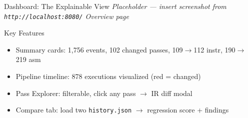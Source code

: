 \documentclass[aspectratio=169]{beamer}
\begin{document}
\begin{frame}{Dashboard: The Explainable View}
  \centering
  \vspace{1em}
  \vspace{0.5em}
  \small \textit{Placeholder — insert screenshot from \texttt{http://localhost:8080/} Overview page}
  \vspace{1em}
  \begin{alertblock}{Key Features}
    \begin{itemize}
      \item Summary cards: 1,756 events, 102 changed passes, 109$\to$112 instr, 190$\to$219 asm
      \item Pipeline timeline: 878 executions visualized (red = changed)
      \item Pass Explorer: filterable, click any pass $\to$ IR diff modal
      \item Compare tab: load two \texttt{history.json} $\to$ regression score + findings
    \end{itemize}
  \end{alertblock}
\end{frame}
\end{document}
